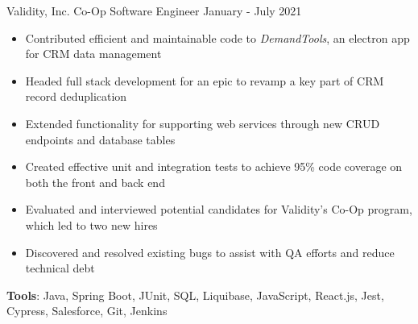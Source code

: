 \documentclass{awesome-cv}
\begin{document}
		\vspace{-0.2cm}

		\begin{cventries}
			\vspace{-0.15cm}
			\cventry
				{Validity, Inc.}
				{Co-Op Software Engineer}
				{January - July 2021}
				{}
				{
					\vspace{-0.3cm}
					\begin{itemize}[nosep]
						\item Contributed efficient and maintainable code to \textit{DemandTools}, an electron app for CRM data management
						\item Headed full stack development for an epic to revamp a key part of CRM record deduplication
						\item Extended functionality for supporting web services through new CRUD endpoints and database tables
						\item Created effective unit and integration tests to achieve 95\% code coverage on both the front and back end
						\item Evaluated and interviewed potential candidates for Validity's Co-Op program, which led to two new hires
						\item Discovered and resolved existing bugs to assist with QA efforts and reduce technical debt
					\end{itemize}
					\vspace{0.2cm}
					\qquad \textbf{Tools}: Java, Spring Boot, JUnit, SQL, Liquibase, JavaScript, React.js, Jest, Cypress, Salesforce, Git, Jenkins
				}
		\end{cventries}
		\vspace{-0.1cm}
\end{document}
